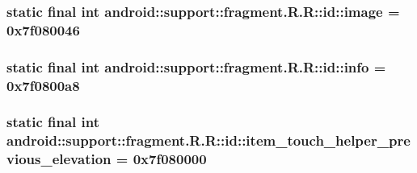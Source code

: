 \hypertarget{classandroid_1_1support_1_1fragment_1_1_r_1_1id_7e51cd185509c054f3bf0fa753a6b3ce}{
\subsubsection[{image}]{\setlength{\rightskip}{0pt plus 5cm}static final int android::support::fragment.R.R::id::image = 0x7f080046}}
\label{classandroid_1_1support_1_1fragment_1_1_r_1_1id_7e51cd185509c054f3bf0fa753a6b3ce}


\hypertarget{classandroid_1_1support_1_1fragment_1_1_r_1_1id_65f32b516ba1cd8be5289326629e63e6}{
\subsubsection[{info}]{\setlength{\rightskip}{0pt plus 5cm}static final int android::support::fragment.R.R::id::info = 0x7f0800a8}}
\label{classandroid_1_1support_1_1fragment_1_1_r_1_1id_65f32b516ba1cd8be5289326629e63e6}


\hypertarget{classandroid_1_1support_1_1fragment_1_1_r_1_1id_8a8b8d04cd53b1ed5c15cd2f37ae4df1}{
\subsubsection[{item\_\-touch\_\-helper\_\-previous\_\-elevation}]{\setlength{\rightskip}{0pt plus 5cm}static final int android::support::fragment.R.R::id::item\_\-touch\_\-helper\_\-previous\_\-elevation = 0x7f080000}}
\label{classandroid_1_1support_1_1fragment_1_1_r_1_1id_8a8b8d04cd53b1ed5c15cd2f37ae4df1}


